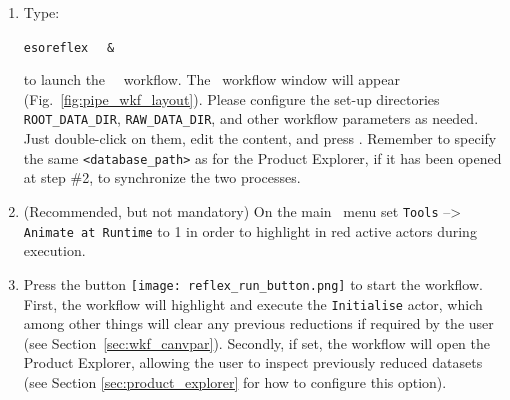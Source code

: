 \begin{enumerate}
{\tt esoreflex -e BOOKKEEPING\_DB <database\_path>} \wkfn\

to point the product explorer to a given {\tt <database\_path>}, e.g., {\tt /home/username/reflex/ reflex\_bookkeeping/test.db}

The Product Explorer allows you to inspect the products while the
reduction is running. Press the button  to update
the content of the Product Explorer.  This step can be launched in parallel to step 1.

A full description of the Product Explorer will be given in Section \ref{sec:product_explorer}

\item
Type: 

{\tt esoreflex } \wkfn\ {\tt \&}

to launch the \wkfname\ \ workflow.  The \wkfname\ workflow
window will appear (Fig.~\ref{fig:pipe_wkf_layout}). Please configure the
set-up directories {\tt ROOT\_DATA\_DIR}, {\tt RAW\_DATA\_DIR}, and
other workflow parameters as needed. Just double-click on them, edit
the content, and press .  Remember to specify the same
{\tt <database\_path>} as for the Product Explorer, if it has been
opened at step \#2, to synchronize the two processes.

\item (Recommended, but not mandatory) On the main \ menu set
  {\tt Tools} --> {\tt Animate at Runtime} to 1 in order to highlight
  in red active actors during execution.

\item Press the button
  \texttt{[image: reflex\_run\_button.png]} to
  start the workflow. First, the workflow will highlight and execute
  the {\tt Initialise} actor, which among other things will clear any
  previous reductions if required by the user (see
  Section~\ref{sec:wkf_canvpar}). Secondly, if set, the workflow will
  open the Product Explorer, allowing the user to inspect previously
  reduced datasets (see Section \ref{sec:product_explorer} for how to
  configure this option).
\end{enumerate}
 